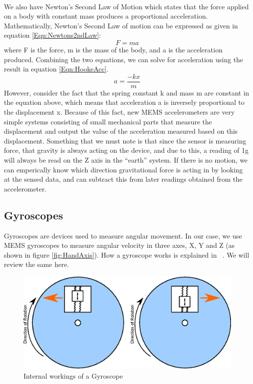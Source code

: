 \hfill \\
We also have Newton's Second Law of Motion
which states that the force applied on a body with constant mass produces a proportional acceleration.
Mathematically, Newton's Second Law of motion can be expressed as given in equation \ref{Eqn:Newtons2ndLaw}:
\begin{equation}
\label{Eqn:Newtons2ndLaw}
F = ma 
\end{equation}
where F is the force, m is the mass of the body, and a is the acceleration produced. Combining the two equations, we can solve for acceleration using the result in equation \ref{Eqn:HookeAcc}.
\begin{equation}
\label{Eqn:HookeAcc}
a = \frac{-kx}{m} 
\end{equation}
However, consider the fact that the spring constant k and mass m are constant in the equation above, which means that acceleration a is inversely proportional to the displacement x. Because of this fact, new MEMS accelerometers are very simple systems consisting of small mechanical parts that measure the displacement and output the value of the acceleration measured based on this displacement.
Something that we must note is that since the sensor is measuring force, that gravity is always acting on the device,
and due to this, a reading of 1g will always be read on the Z axis in the ``earth'' system.
If there is no motion, we can emperically know which direction gravitational force is acting in by looking at the sensed data,
and can subtract this from later readings obtained from the accelerometer.

\subsection{Gyroscopes}
\label{Sec:Gyroscope}

Gyroscopes are devices used to measure angular movement. In our case, we use MEMS gyroscopes to measure angular velocity in three axes, X, Y and Z (as shown in figure \ref{fig:HandAxis}). How a gyroscope works is explained in ~\cite{Web:SparkfunGyros}. We will review the same here.
\begin{figure}
\begin{center}
\includegraphics{images/GyroWork.eps}
\caption{Internal workings of a Gyroscope}
\label{fig:GyroDiag}
\end{center}
\end{figure}

